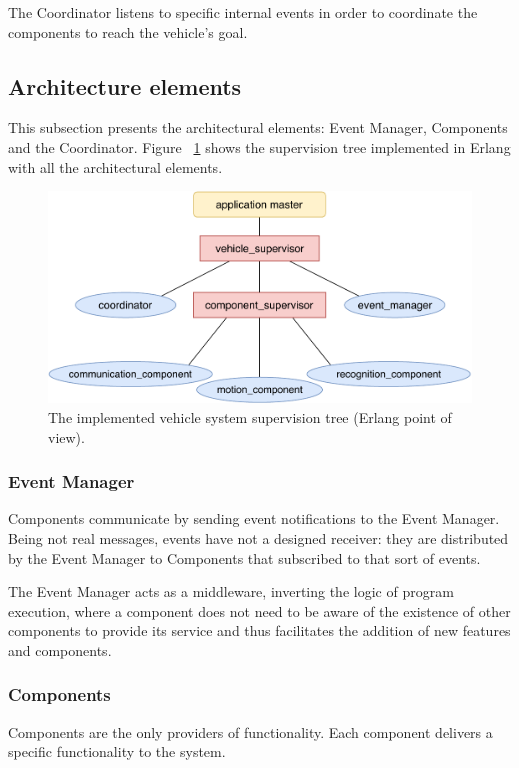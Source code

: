 \documentclass{memoir}
\begin{document}
The Coordinator listens to specific internal events in order to coordinate the components to reach the vehicle's goal.

\subsection{Architecture elements}

This subsection presents the architectural elements: Event Manager, Components and the Coordinator. Figure ~\ref{fig:erlang-point-of-view} shows the supervision tree implemented in Erlang with all the architectural elements.

\begin{figure}
	\centering
	\includegraphics[width=0.8\linewidth]{implementation_details/erlang_point-of-view.pdf}
	\caption{The implemented vehicle system supervision tree (Erlang point of view).}
	\label{fig:erlang-point-of-view}
\end{figure}

\subsubsection{Event Manager}

Components communicate by sending event notifications to the Event Manager.
Being not real messages, events have not a designed receiver: they are distributed by the Event Manager to Components that subscribed to that sort of events.

The Event Manager acts as a middleware, inverting the logic of program execution, where a component does not need to be aware of the existence of other components to provide its service and thus facilitates the addition of new features and components.

\subsubsection{Components}

Components are the only providers of functionality. Each component delivers a specific functionality to the system.
\end{document}
